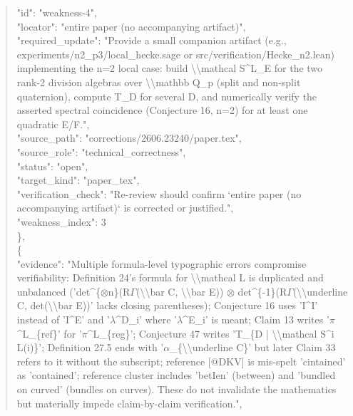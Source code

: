 \documentclass[11pt]{article}
\begin{document}
\begin{quote}
      "id": "weakness-4",\\
      "locator": "entire paper (no accompanying artifact)",\\
      "required\_update": "Provide a small companion artifact (e.g., experiments/n2\_p3/local\_hecke.sage or src/verification/Hecke\_n2.lean) implementing the n=2 local case: build \textbackslash{}\textbackslash{}mathcal S\^{}L\_E for the two rank-2 division algebras over \textbackslash{}\textbackslash{}mathbb Q\_p (split and non-split quaternion), compute T\_D for several D, and numerically verify the asserted spectral coincidence (Conjecture 16, n=2) for at least one quadratic E/F.",\\
      "source\_path": "corrections/2606.23240/paper.tex",\\
      "source\_role": "technical\_correctness",\\
      "status": "open",\\
      "target\_kind": "paper\_tex",\\
      "verification\_check": "Re-review should confirm `entire paper (no accompanying artifact)` is corrected or justified.",\\
      "weakness\_index": 3\\
    \},\\
    \{\\
      "evidence": "Multiple formula-level typographic errors compromise verifiability: Definition 24's formula for \textbackslash{}\textbackslash{}mathcal L is duplicated and unbalanced ('det\^{}\{\ensuremath{\otimes}n\}(R\ensuremath{\Gamma}(\textbackslash{}\textbackslash{}bar C, \textbackslash{}\textbackslash{}bar E)) \ensuremath{\otimes} det\^{}\{-1\}(R\ensuremath{\Gamma}(\textbackslash{}\textbackslash{}underline C, det(\textbackslash{}\textbackslash{}bar E))' lacks closing parentheses); Conjecture 16 uses 'I\^{}I' instead of 'I\^{}E' and '\ensuremath{\lambda}\^{}D\_i' where '\ensuremath{\lambda}\^{}E\_i' is meant; Claim 13 writes '\ensuremath{\pi}\^{}L\_\{ref\}' for '\ensuremath{\pi}\^{}L\_\{reg\}'; Conjecture 47 writes 'T\_\{D | \textbackslash{}\textbackslash{}mathcal S\^{}i L(i)\}'; Definition 27.5 ends with '\ensuremath{\alpha}\_\{\textbackslash{}\textbackslash{}underline C\}' but later Claim 33 refers to it without the subscript; reference [@DKV] is mis-spelt 'cintained' as 'contained'; reference cluster includes 'betIen' (between) and 'bundled on curved' (bundles on curves). These do not invalidate the mathematics but materially impede claim-by-claim verification.",\\

\end{quote}
\end{document}
